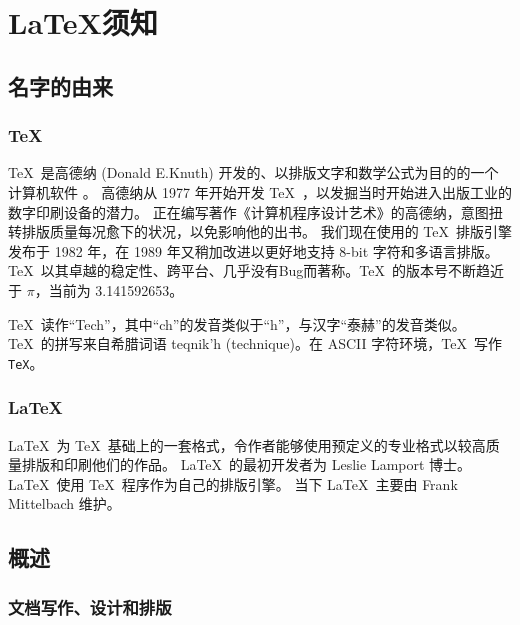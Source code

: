 \chapter{\LaTeX 须知}

\leavevmode\nobreakspace

\section{名字的由来}

\subsection{\protect\TeX}

\TeX\ 是高德纳 (Donald E.Knuth) 开发的、以排版文字和数学公式为目的的一个计算机软件 \cite{texbook}。
高德纳从 1977 年开始开发 \TeX\ ，以发掘当时开始进入出版工业的数字印刷设备的潜力。
正在编写著作《计算机程序设计艺术》的高德纳，意图扭转排版质量每况愈下的状况，以免影响他的出书。
我们现在使用的 \TeX\ 排版引擎发布于 1982 年，在 1989 年又稍加改进以更好地支持 8-bit 字符和多语言排版。
\TeX\ 以其卓越的稳定性、跨平台、几乎没有Bug而著称。\TeX\ 的版本号不断趋近于 $\pi$，当前为 3.141592653。

\TeX\ 读作``Tech''，其中``ch''的发音类似于``h''，与汉字“泰赫”的发音类似。\TeX\ 的拼写来自希腊词语
{\selectfont teqnik'h} (technique)。在 ASCII 字符环境，\TeX\ 写作 \texttt{TeX}。

\subsection{\LaTeX}

\LaTeX\ 为 \TeX\ 基础上的一套格式，令作者能够使用预定义的专业格式以较高质量排版和印刷他们的作品。
\LaTeX\ 的最初开发者为 Leslie Lamport 博士\cite{manual}。\LaTeX\ 使用 \TeX\ 程序作为自己的排版引擎。
当下 \LaTeX\ 主要由 Frank Mittelbach 维护。

\section{概述}

\leavevmode\nobreakspace

\subsection{文档写作、设计和排版}

\leavevmode\nobreakspace

